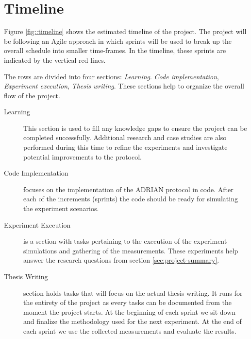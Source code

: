 \section{Timeline} \label{sec:timeline}
Figure \ref{fig::timeline} shows the estimated timeline of the project. The project will be following an Agile approach in which sprints will be used to break up the overall schedule into smaller time-frames. In the timeline, these sprints are indicated by the vertical red lines. 

The rows are divided into four sections: \emph{Learning}. \emph{Code implementation}, \emph{Experiment execution}, \emph{Thesis writing}. These sections help to organize the overall flow of the project.

\begin{description}
    \item[Learning] This section is used to fill any knowledge gaps to ensure the project can be completed successfully. Additional research and case studies are also performed during this time to refine the experiments and investigate potential improvements to the protocol.
    \item[Code Implementation] focuses on the implementation of the ADRIAN protocol in code. After each of the increments (sprints) the code should be ready for simulating the experiment scenarios. 
    \item[Experiment Execution] is a section with tasks pertaining to the execution of the experiment simulations and gathering of the measurements. These experiments help answer the research questions from section \ref{sec:project-summary}.
    \item[Thesis Writing] section holds tasks that will focus on the actual thesis writing. It runs for the entirety of the project as every tasks can be documented from the moment the project starts. At the beginning of each sprint we sit down and finalize the methodology used for the next experiment. At the end of each sprint we use the collected measurements and evaluate the results.
\end{description}

